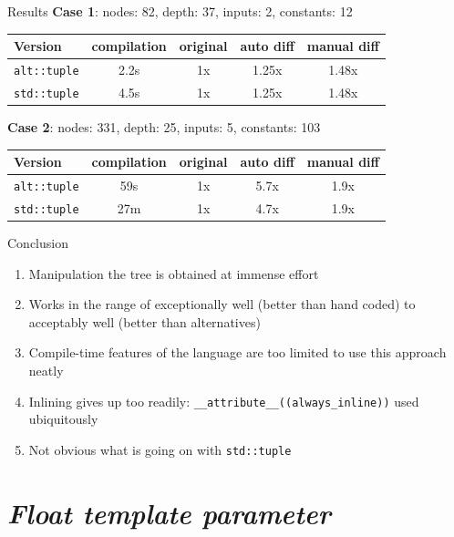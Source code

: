\documentclass[xcolor=dvipsnames]{beamer}
\begin{document}
\begin{frame}[fragile]{Results}
\textbf{Case 1}: nodes: 82, depth: 37, inputs: 2, constants: 12
\begin{table}
\begin{tabular}{l | c | c | c | c }
Version & compilation & original & auto diff & manual diff \\
\hline \hline
\texttt{alt::tuple} & 2.2s & 1x & 1.25x & 1.48x \\
\texttt{std::tuple} & 4.5s & 1x & 1.25x & 1.48x \\
\end{tabular}
\end{table}
\vspace{10mm}
\textbf{Case 2}: nodes: 331, depth: 25, inputs: 5, constants: 103
\begin{table}
\begin{tabular}{l | c | c | c | c }
Version & compilation & original & auto diff & manual diff \\
\hline \hline
\texttt{alt::tuple} & 59s & 1x & 5.7x & 1.9x \\
\texttt{std::tuple} & 27m & 1x & 4.7x & 1.9x \\
\end{tabular}
\end{table}
\end{frame}


\begin{frame}[fragile]{Conclusion}
  \begin{enumerate}
  \item Manipulation the tree is obtained at immense effort \vspace{5mm}
  \item Works in the range of exceptionally well (better than hand coded) to acceptably well (better than alternatives) \vspace{5mm}
  \item Compile-time features of the language are too limited to use this approach neatly \vspace{5mm}
  \item Inlining gives up too readily: \verb$__attribute__((always_inline))$ used ubiquitously \vspace{5mm}
  \item Not obvious what is going on with \verb$std::tuple$ \vspace{5mm}
  \end{enumerate}
\end{frame}


\section{\protect\textit{Float template parameter}}
\end{document}
